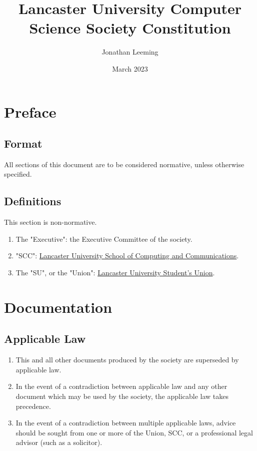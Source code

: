 \documentclass{scrartcl}
\title{Lancaster University Computer Science Society Constitution}
\author{Jonathan Leeming}
\date{March 2023}
\begin{document}
    \maketitle

    \clearpage
    \tableofcontents

    \clearpage
    \section{Preface}
        \label{preface}
        \subsection{Format}
            \label{preface--format}
            All sections of this document are to be considered normative, unless otherwise specified.

        \subsection{Definitions}
            \label{preface--definition}
            This section is non-normative.

            \begin{enumerate}
                \item \label{preface--definition--executive} The "Executive": the Executive Committee of the society.
                \item \label{preface--definition--scc} "SCC": \href{https://www.lancaster.ac.uk/scc}{Lancaster University School of Computing and Communications}.
                \item \label{preface--definition--su} The "SU", or the "Union": \href{https://www.lancastersu.co.uk}{Lancaster University Student's Union}.
            \end{enumerate}

    \clearpage
    \section{Documentation}
        \label{documentation}
        \subsection{Applicable Law}
            \label{documentation--applicable-law}
            \begin{enumerate}
                \item This and all other documents produced by the society are superseded by applicable law.
                \item In the event of a contradiction between applicable law and any other document which may be used by the society, the applicable law takes precedence.
                \item In the event of a contradiction between multiple applicable laws, advice should be sought from one or more of the Union, SCC, or a professional legal advisor (such as a solicitor).
            \end{enumerate}
\end{document}
